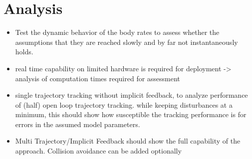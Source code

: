 \chapter{Analysis}\label{chap:analysis}


\begin{itemize}
	\color{red}
	\item Test the dynamic behavior of the body rates to assess whether the assumptions that they are reached slowly and by far not instantaneously holds.
	\item real time capability on limited hardware is required for deployment -> analysis of computation times required for assessment
	\item single trajectory tracking without implicit feedback, to analyze performance of (half) open loop trajectory tracking. while keeping disturbances at a minimum, this should show how susceptible the tracking performance is for errors in the assumed model parameters.
	\item Multi Trajectory/Implicit Feedback should show the full capability of the approach. Collision avoidance can be added optionally
\end{itemize}

